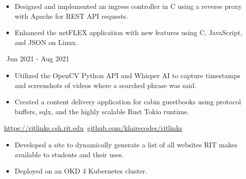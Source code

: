 \documentclass[11pt,letterpaper,ragged2e]{altacv}
\begin{document}
{
	\begin{itemize}
		\item Designed and implemented an ingress controller in C using a reverse proxy with Apache for REST API requests.
		\item Enhanced the netFLEX application with new features using C, JavaScript, and JSON on Linux.
	\end{itemize}
}
{\faCalendar\, Jun 2021 - Aug 2021}
{
}



{
	\begin{itemize}
		\item Utilized the OpenCV Python API and Whisper AI to capture timestamps and screenshots of videos where a searched phrase was said.
	\end{itemize}
}
{
}

{
	\begin{itemize}
		\item Created a content delivery application for cabin guestbooks using protocol buffers, sqlx, and the highly scalable Rust Tokio runtime.
	\end{itemize}
}
{
}

{
	{\faLink} \,\href{https://ritlinks.csh.rit.edu}{https://ritlinks.csh.rit.edu}\quad
	{\faGithub} \,\href{https://github.com/klairecodes/ritlinks}{github.com/klairecodes/ritlinks}
}
{
	\begin{itemize}
		\item Developed a site to dynamically generate a list of all websites RIT makes available to students and their uses.
		\item Deployed on an OKD 4 Kubernetes cluster.
	\end{itemize}
}
{
}


\clearpage

\nocite{*}
\end{document}
